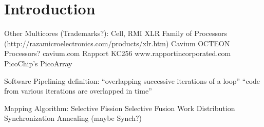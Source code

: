 \section{Introduction}


Other Multicores (Trademarks?):
Cell, 
RMI XLR Family of Processors
  (http://razamicroelectronics.com/products/xlr.htm)
Cavium OCTEON Processors?  cavium.com
Rapport KC256 www.rapportincorporated.com
PicoChip's PicoArray

Software Pipelining definition:
``overlapping successive iterations of a loop''
``code from various iterations are overlapped in time''


Mapping Algorithm:
 Selective Fission
 Selective Fusion		 
 Work Distribution
 Synchronization Annealing (maybe Synch?)


